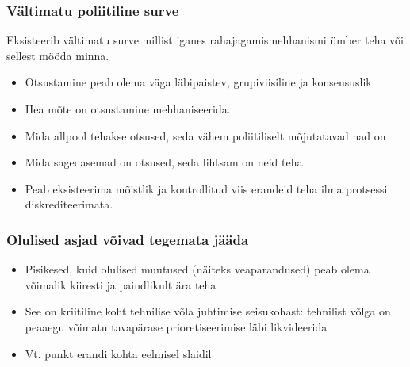 \begin{frame}[fragile]
  \frametitle{Vältimatu poliitiline surve}
  Eksisteerib vältimatu surve millist iganes rahajagamismehhanismi ümber teha või sellest mööda minna.
		\begin{itemize}
			\item Otsustamine peab olema väga läbipaistev, grupiviisiline ja konsensuslik
			\item Hea mõte on otsustamine mehhaniseerida. 
			\item Mida allpool tehakse otsused, seda vähem poliitiliselt mõjutatavad nad on
			\item Mida sagedasemad on otsused, seda lihtsam on neid teha 
			\item Peab eksisteerima mõistlik ja kontrollitud viis erandeid teha ilma protsessi diskrediteerimata. 
		\end{itemize}
\end{frame}

\begin{frame}[fragile]
  \frametitle{Olulised asjad võivad tegemata jääda}
		\begin{itemize}
			\item Pisikesed, kuid olulised muutused (näiteks veaparandused) peab olema võimalik kiiresti ja paindlikult ära teha
			\item See on kriitiline koht tehnilise võla juhtimise seisukohast: tehnilist võlga on peaaegu võimatu tavapärase prioretiseerimise läbi likvideerida 
			\item Vt. punkt erandi kohta eelmisel slaidil
		\end{itemize}
\end{frame}


